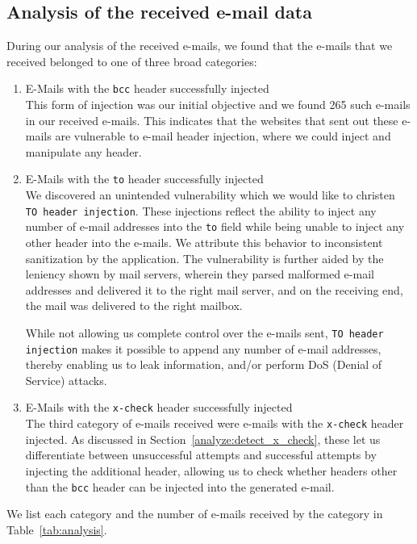 \subsection{Analysis of the received e-mail data}
During our analysis of the received e-mails, we found that the e-mails that we received belonged to one of three broad categories:
\begin{enumerate}
	\item E-Mails with the \texttt{bcc} header successfully injected\\
	This form of injection was our initial objective and we found 265 such e-mails in our received e-mails. This indicates that the websites that sent out these e-mails are vulnerable to e-mail header injection, where we could inject and manipulate any header.
	
	\item E-Mails with the \texttt{to} header successfully injected\\
	We discovered an unintended vulnerability which we would like to christen \texttt{TO~header injection}. These injections reflect the ability to inject any number of e-mail addresses into the \texttt{to} field while being unable to inject any other header into the e-mails. We attribute this behavior to inconsistent sanitization by the application. 
	The vulnerability is further aided by the leniency shown by mail servers, wherein they parsed malformed e-mail addresses and delivered it to the right mail server, and on the receiving end, the mail was delivered to the right mailbox. 
	
	While not allowing us complete control over the e-mails sent, \texttt{TO header injection} makes it possible to append any number of e-mail addresses, thereby enabling us to leak information, and/or perform DoS (Denial of Service) attacks.
	
	\item E-Mails with the \texttt{x-check} header successfully injected\\
    The third category of e-mails received were e-mails with the \texttt{x-check} header injected. As discussed in Section~\ref{analyze:detect_x_check}, 
    these let us differentiate between unsuccessful attempts and successful attempts by injecting the additional header, allowing us to check whether headers other than the \texttt{bcc} header can be injected into the generated e-mail. 
\end{enumerate}
We list each category and the number of e-mails received by the category in Table~\ref{tab:analysis}. 

